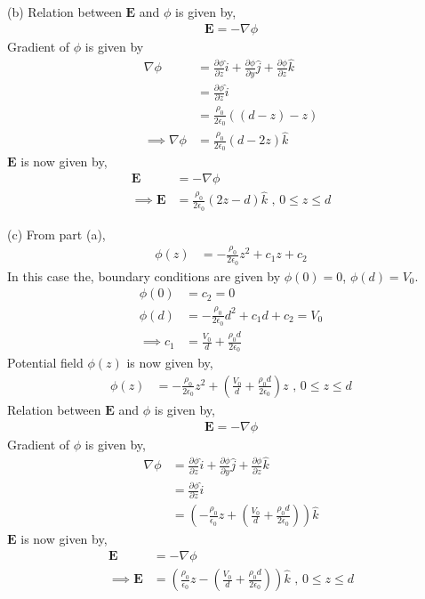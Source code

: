 \documentclass[12pt]{article}
\providecommand{\brak}[1]{\ensuremath{\left(#1\right)}}
\begin{document}
(b) Relation between $\mathbf{E}$ and $\phi$ is given by,
\begin{align*}
    \mathbf{E} = -\nabla \phi
\end{align*}
Gradient of $\phi$ is given by
\begin{align*}
    \nabla \phi &= \frac{\partial \phi}{\partial z} \hat{i} + \frac{\partial \phi}{\partial y} \hat{j} + \frac{\partial \phi}{\partial z} \hat{k}\\
    &= \frac{\partial \phi}{\partial z} \hat{i}\\
    &= \frac{\rho_0}{2\epsilon_0} \brak{\brak{d- z} - z}\\
    \implies \nabla \phi &= \frac{\rho_0}{2\epsilon_0}\brak{d - 2z} \hat{k}
\end{align*}
$\mathbf{E}$ is now given by,
\begin{align*}
    \mathbf{E} &= -\nabla \phi\\
    \implies \mathbf{E} &= \frac{\rho_0}{2\epsilon_0}\brak{2z - d} \hat{k} \text{ , } 0 \leq z \leq d
\end{align*}

(c) From part (a),
\begin{align*}
    \phi \brak{z} &= -\frac{\rho_0}{2\epsilon_0} z^2 + c_1 z + c_2
\end{align*}
In this case the, boundary conditions are given by $\phi\brak{0} = 0$, $\phi\brak{d} = V_0$.
\begin{align*}
    \phi\brak{0} &= c_2 = 0\\
    \phi\brak{d} &= -\frac{\rho_0}{2\epsilon_0} d^2 + c_1 d + c_2 = V_0\\
    \implies c_1 &= \frac{V_0}{d} + \frac{\rho_0 d}{2 \epsilon_0}
\end{align*}
Potential field $\phi\brak{z}$ is now given by,
\begin{align*}
    \phi \brak{z} &= -\frac{\rho_0}{2\epsilon_0} z^2 + \brak{\frac{V_0}{d} + \frac{\rho_0 d}{2 \epsilon_0}} z \text{ , } 0 \leq z \leq d
\end{align*}
Relation between $\mathbf{E}$ and $\phi$ is given by,
\begin{align*}
    \mathbf{E} = -\nabla \phi
\end{align*}
Gradient of $\phi$ is given by,
\begin{align*}
    \nabla \phi &= \frac{\partial \phi}{\partial z} \hat{i} + \frac{\partial \phi}{\partial y} \hat{j} + \frac{\partial \phi}{\partial z} \hat{k}\\
    &= \frac{\partial \phi}{\partial z} \hat{i}\\
    &= \brak{-\frac{\rho_0}{\epsilon_0} z + \brak{\frac{V_0}{d} + \frac{\rho_0d}{2\epsilon_0}}}\hat{k}
\end{align*}
$\mathbf{E}$ is now given by,
\begin{align*}
    \mathbf{E} &= -\nabla \phi\\
    \implies \mathbf{E} &= \brak{\frac{\rho_0}{\epsilon_0} z - \brak{\frac{V_0}{d} + \frac{\rho_0d}{2\epsilon_0}}} \hat {k}\text{ , } 0 \leq z \leq d
\end{align*}
\end{document}

